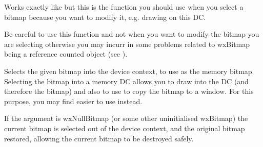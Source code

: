 \label{wxmemorydcselectobject}


Works exactly like  but
this is the function you should use when you select a bitmap because you want to modify
it, e.g. drawing on this DC.

Be careful to use this function and not 
when you want to modify the bitmap you are selecting otherwise you may incurr in some
problems related to wxBitmap being a reference counted object
(see ).





\label{wxmemorydcselectobjectassource}


Selects the given bitmap into the device context, to use as the memory
bitmap. Selecting the bitmap into a memory DC allows you to draw into
the DC (and therefore the bitmap) and also to use  to copy
the bitmap to a window. For this purpose, you may find \rtfsp
easier to use instead.

If the argument is wxNullBitmap (or some other uninitialised wxBitmap) the current bitmap is
selected out of the device context, and the original bitmap restored, allowing the current bitmap to
be destroyed safely.



